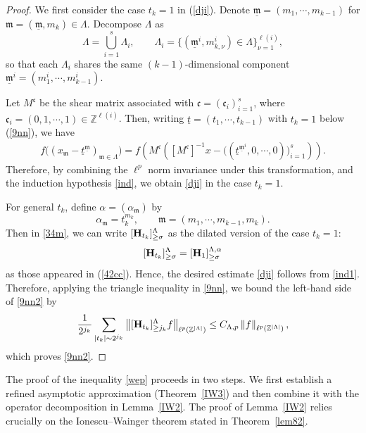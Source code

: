 \documentclass[11 pt,letterpaper]{amsart}
\theoremstyle{plain}
\theoremstyle{definition}
\theoremstyle{remark} \theoremstyle{exam} \theoremstyle{ob}
\numberwithin{equation}{section}
\begin{document}
\begin{proof}
We first consider the case $t_k=1$ in (\ref{dji}).
Denote $\underline{\mathfrak{m}}=(m_1,\cdots,m_{k-1})$ for $\mathfrak{m}=(\underline{\mathfrak{m}},m_k)\in \Lambda$. 
Decompose $\Lambda$ as
\[
\Lambda=\bigcup_{i=1}^s\Lambda_i,
\qquad
\Lambda_i=\{(\underline{\mathfrak{m}}^i,m_{k,\nu}^i)\in \Lambda\}_{\nu=1}^{\ell(i)},
\]
so that each $\Lambda_i$ shares the same $(k-1)$-dimensional component $\underline{\mathfrak{m}}^i=(m_1^{i},\cdots,m_{k-1}^{i})$.

Let $M^{\mathfrak{c}}$ be the shear matrix associated with $\mathfrak{c}=(\mathfrak{c}_i)_{i=1}^s$, where $\mathfrak{c}_i=(0,1,\cdots,1)\in \mathbb{Z}^{\ell(i)}$. Then,  writing $\underline{t}=(t_1,\cdots,t_{k-1})$ with $t_k=1$ below  (\ref{9nn}), we have
\begin{align*}
f\big((x_{\mathfrak{m}}- \underline{t}^{\underline{\mathfrak{m}}})_{\mathfrak{m}\in \Lambda}\big)
=
f\!\left(
M^{\mathfrak{c}}\!\left(
[M^{\mathfrak{c}}]^{-1}x
-
\big((\underline{t}^{\underline{\mathfrak{m}}^i},0,\cdots,0)\big)_{i=1}^s
\right)
\right).
\end{align*}
Therefore,  by combining the $\ell^p$ norm invariance   under this transformation, and  the induction hypothesis \eqref{ind}, we obtain \eqref{dji} in the case $t_k=1$.

For general $t_k$, define $\alpha=(\alpha_{\mathfrak{m}})$ by
\[
\alpha_{\mathfrak{m}}=t_k^{m_k}, \qquad \mathfrak{m}=(m_1,\cdots,m_{k-1},m_k).
\]
 Then in \eqref{34m}, we can write  $[{\bf H}_{t_k}]^{\Lambda}_{\ge \sigma}$ as the dilated version of the case $t_k=1$:
\[
[{\bf H}_{t_k}]^{\Lambda}_{\ge \sigma}
=
[{\bf H}_{1}]^{\Lambda,\alpha}_{\ge \sigma}
\]
as those appeared in   (\ref{42cc}).
Hence, the desired estimate \eqref{dji} follows from \eqref{ind1}.
Therefore, applying the triangle inequality in \eqref{9nn}, we bound the left-hand side of \eqref{9nn2} by
\[
\frac{1}{2^{j_k}} \sum_{|t_k|\sim 2^{j_k}}
\left\| [{\bf H}_{t_k}]^{\Lambda}_{\ge j_k}f\right\|_{\ell^p(\mathbb{Z}^{|\Lambda|})}
\le
C_{\Lambda,p}\left\| f\right\|_{\ell^p(\mathbb{Z}^{|\Lambda|})},
\]
which proves \eqref{9nn2}.
\end{proof}



 The proof of the inequality \eqref{wep} proceeds in two steps. We first establish a refined asymptotic approximation (Theorem~\ref{IW3}) and then combine it with the operator decomposition in Lemma~\ref{IW2}. 
The proof of Lemma~\ref{IW2} relies crucially on the Ionescu--Wainger theorem stated in Theorem~\ref{lem82}.
\end{document}
